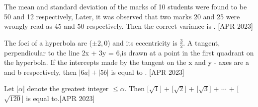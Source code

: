     \item The mean and standard deviation of the marks of 10 students were found to be 50 and 12 respectively, Later, it was observed that two marks 20 and 25 were wrongly read as 45 and 50 respectively. Then the correct variance is  \underline{\hspace{1cm}}. \hfill{[APR 2023]}
    \bigskip
    
    \item The foci of a hyperbola are ($\pm2 , 0$) and its eccentricity is $\frac{3}{2}$. A tangent, perpendicular to the line 2x + 3y = 6,is drawn at a point in the first quadrant on the hyperbola. If the intercepts made by the tangent on the x and y - axes are a and b respectively, then $|6a| + |5b|$ is equal to \underline{\hspace{1cm}}. \hfill{[APR 2023]}
    \bigskip
    
    \item Let [$\alpha$] denote the greatest integer $\leq \alpha$. Then  [$\sqrt1$] + [$\sqrt2$] + [$\sqrt3$] + $\cdots$ + [$\sqrt{120}$]  is equal to\underline{\hspace{1cm}}.\hfill{[APR 2023]}
